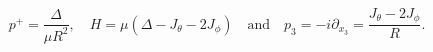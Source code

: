 \begin{equation}  \label{eq:dict2IIA}
p^+  =  \frac{\Delta}{\mu R^2}, \quad
H  =  \mu \left( \Delta - J_\theta -2 J_\phi \right)
\quad \textrm{and} \quad
p_3 = -i \partial_{x_3} = \frac{J_\theta - 2 J_\phi}{R}.
\end{equation}


